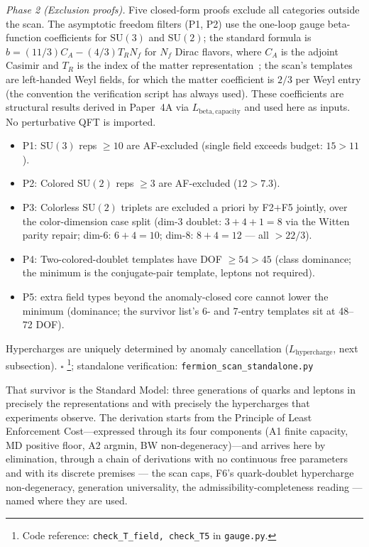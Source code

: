 \documentclass[11pt]{article}
\newenvironment{varlist}{\begin{itemize}[nosep,leftmargin=2em]}{\end{itemize}}
\newcommand{\coderef}[2]{\footnote{Code reference: \texttt{#1} in \texttt{#2}.}}
\newcommand{\SU}{\mathrm{SU}}
\begin{document}
\begin{tcolorbox}[apfbox, title={Theorem $T_{\mathrm{field}}$ (SM Fermion Content)}]
\textit{Phase 2 (Exclusion proofs).}  Five closed-form proofs exclude all categories outside the scan.  The asymptotic freedom filters (P1, P2) use the one-loop gauge beta-function coefficients for $\SU(3)$ and $\SU(2)$; the standard formula is $b = (11/3)C_A - (4/3)T_R N_f$ for $N_f$ Dirac flavors, where $C_A$ is the adjoint Casimir and $T_R$ is the index of the matter representation~\cite{PeskinSchroeder1995}; the scan's templates are left-handed Weyl fields, for which the matter coefficient is $2/3$ per Weyl entry (the convention the verification script has always used).  These coefficients are structural results derived in Paper~4A via $L_{\mathrm{beta,capacity}}$ and used here as inputs.  No perturbative QFT is imported.
\begin{varlist}
\item P1: $\SU(3)$ reps $\ge 10$ are AF-excluded (single field exceeds budget: $15 > 11$).
\item P2: Colored $\SU(2)$ reps $\ge 3$ are AF-excluded ($12 > 7.3$).
\item P3: Colorless $\SU(2)$ triplets are excluded a priori by F2$+$F5 jointly, over the color-dimension case split (dim-3 doublet: $3+4+1 = 8$ via the Witten parity repair; dim-6: $6+4 = 10$; dim-8: $8+4 = 12$ --- all $> 22/3$).
\item P4: Two-colored-doublet templates have DOF $\ge 54 > 45$ (class dominance; the minimum is the conjugate-pair template, leptons not required).
\item P5: extra field types beyond the anomaly-closed core cannot lower the minimum (dominance; the survivor list's 6- and 7-entry templates sit at 48--72 DOF).
\end{varlist}

Hypercharges are uniquely determined by anomaly cancellation ($L_{\mathrm{hypercharge}}$, next subsection).  $\square$
\coderef{check\_T\_field, check\_T5}{gauge.py}; standalone verification: \texttt{fermion\_scan\_standalone.py}~\cite{BrookeFermionScan}
\end{tcolorbox}

That survivor is the Standard Model: three generations of quarks and leptons in precisely the representations and with precisely the hypercharges that experiments observe.  The derivation starts from the Principle of Least Enforcement Cost---expressed through its four components (A1 finite capacity, MD positive floor, A2 argmin, BW non-degeneracy)---and arrives here by elimination, through a chain of derivations with no continuous free parameters and with its discrete premises --- the scan caps, F6's quark-doublet hypercharge non-degeneracy, generation universality, the admissibility-completeness reading --- named where they are used.
\end{document}
